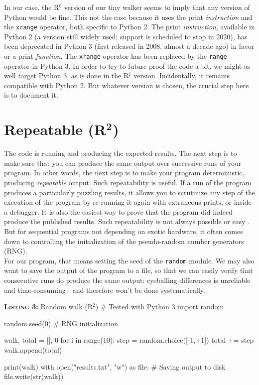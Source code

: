 \documentclass[a4paper,11pt]{article}
\begin{document}
In our case, the R$^0$ version of our tiny walker seems to imply that any version of Python would be fine. This not the case because it uses the print {\em instruction} and the {\tt xrange} operator, both specific to Python 2. The print {\em instruction}, available in Python 2 (a version still widely used; support is scheduled to stop in 2020), has been deprecated in Python 3 (first released in 2008, almost a decade ago) in favor or a  print {\em function}. The {\tt xrange} operator has been replaced by the {\tt range} operator in Python 3. In order to try to future-proof the code a bit, we might as well target Python 3, as is done in the R$^1$ version. Incidentally, it remains compatible with Python 2. But whatever version is chosen, the crucial step here is to document it.


\section*{Repeatable (R$^{\mathbf 2}$)}

The code is running and producing the expected results. The next step is to make sure that you can produce the same output over successive runs of your program. In other words, the next step is to make your program deterministic, producing {\em repeatable} output. Such repeatability is useful. If a run of the program produces a particularly puzzling results, it allows you to scrutinize any step of the execution of the program by re-running it again with extraneous prints, or inside a debugger. It is also the easiest way to prove that the program did indeed produce the published results. Such repeatability is not always possible or easy \citep{Diethelm:2012, Courtes:2015}. But for sequential programs not depending on exotic hardware, it often comes down to controlling the initialization of the pseudo-random number generators (RNG).\\

For our program, that means setting the seed of the {\tt random} module. We may also want to save the output of the program to a file, so that we can easily verify that consecutive runs do produce the same output: eyeballing differences is unreliable and  time-consuming---and therefore won't be done systematically.\\

\noindent \begin{minipage}[c]{\linewidth}
\begin{code}{\textbf{\textsc{Listing 3:}} Random walk (R$^2$)}
# Tested with Python 3
import random

random.seed(0) # RNG initialization

walk, total = [], 0
for i in range(10):
    step = random.choice([-1,+1])     
    total += step
    walk.append(total)
    
print(walk)
with open("results.txt", "w") as file: # Saving output to disk
    file.write(str(walk))
\end{code}
\end{minipage}\\
\end{document}
